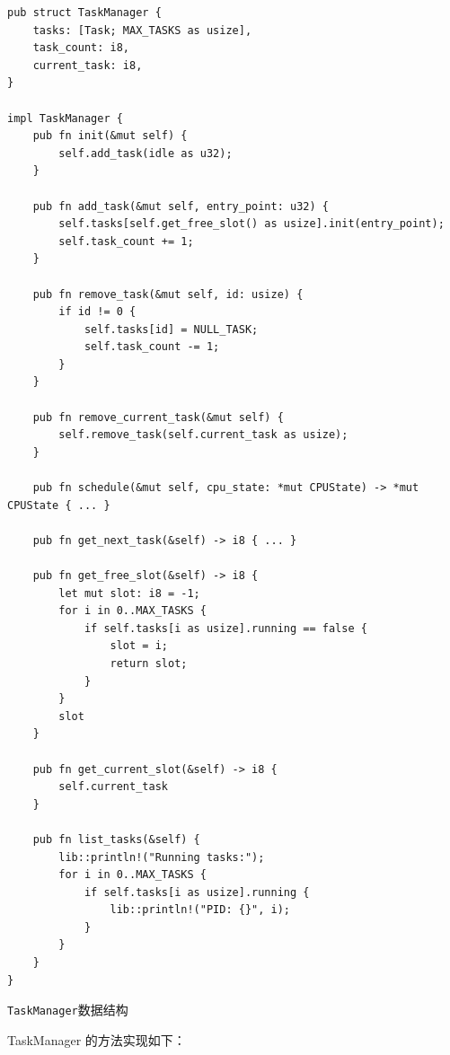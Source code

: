 \begin{listing}[htbp]
    \begin{verbatim}
pub struct TaskManager {
    tasks: [Task; MAX_TASKS as usize],
    task_count: i8,
    current_task: i8,
}

impl TaskManager {
    pub fn init(&mut self) {
        self.add_task(idle as u32);
    }

    pub fn add_task(&mut self, entry_point: u32) {
        self.tasks[self.get_free_slot() as usize].init(entry_point);
        self.task_count += 1;
    }

    pub fn remove_task(&mut self, id: usize) {
        if id != 0 {
            self.tasks[id] = NULL_TASK;
            self.task_count -= 1;
        }
    }

    pub fn remove_current_task(&mut self) {
        self.remove_task(self.current_task as usize);
    }

    pub fn schedule(&mut self, cpu_state: *mut CPUState) -> *mut CPUState { ... }

    pub fn get_next_task(&self) -> i8 { ... }

    pub fn get_free_slot(&self) -> i8 {
        let mut slot: i8 = -1;
        for i in 0..MAX_TASKS {
            if self.tasks[i as usize].running == false {
                slot = i;
                return slot;
            }
        }
        slot
    }

    pub fn get_current_slot(&self) -> i8 {
        self.current_task
    }

    pub fn list_tasks(&self) {
        lib::println!("Running tasks:");
        for i in 0..MAX_TASKS {
            if self.tasks[i as usize].running {
                lib::println!("PID: {}", i);
            }
        }
    }
}
    \end{verbatim}
    \caption{\texttt{TaskManager}数据结构}\label{lst:TaskManagerDataStructure}
\end{listing}

TaskManager 的方法实现如下：

